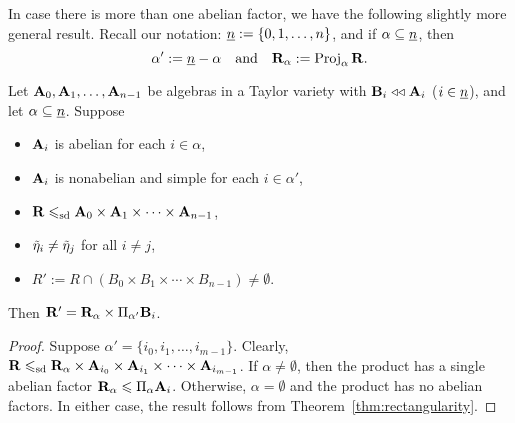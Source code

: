 In case there is more than one abelian factor, we have the following slightly more general result.
Recall our notation: $\underline{n} := \{0,1,\dots, n\}$, and if $\alpha\subseteq \underline{n}$, then 
\[
\alpha' := \underline{n}-\alpha \quad \text{and} \quad
\mathbf{R}_\alpha := \operatorname{Proj}_{\alpha} \mathbf{R}.\]
\begin{corollary}
\label{cor:tayl-vari-abel-fact}
Let $\mathbf{A}_0, \mathbf{A}_1, \dots, \mathbf{A}_{n-1}$ be algebras in a
Taylor variety with $\mathbf{B}_i \mathrel{\triangleleft\triangleleft} \mathbf{A}_i$ ($i\in \underline{n}$),
and let $\alpha \subseteq \underline{n}$.  Suppose
\begin{itemize}
\item $\mathbf{A}_i$ is abelian for each $i \in \alpha$,
\item $\mathbf{A}_i$ is nonabelian and simple for each $i \in \alpha'$,
\item $\mathbf{R} \leqslant_{\mathrm{sd}} \mathbf{A}_0 \times \mathbf{A}_1 \times \cdots \times \mathbf{A}_{n-1}$,
\item $\tilde{\eta}_i \neq \tilde{\eta}_j$ for all $i\neq j$, %
\item $R':= R \cap (B_0 \times B_1 \times \cdots \times B_{n-1}) \neq \emptyset$.
\end{itemize}
Then $\mathbf{R}'= \mathbf{R}_\alpha  \times \Pi_{\alpha'}\mathbf{B}_i$.
\end{corollary}
\begin{proof}
Suppose $\alpha' = \{i_0, i_1, \dots, i_{m-1}\}$.
Clearly, 
$\mathbf{R} \leqslant_{\mathrm{sd}} \mathbf{R}_\alpha \times \mathbf{A}_{i_0} \times \mathbf{A}_{i_1} \times \cdots \times \mathbf{A}_{i_{m-1}}$. 
If $\alpha\neq \emptyset$, then the product 
has a single abelian factor %
$\mathbf{R}_\alpha \leqslant \Pi_{\alpha} \mathbf{A}_i$.
Otherwise, $\alpha= \emptyset$ and the product has no abelian factors.
In either case, the result follows from Theorem~\ref{thm:rectangularity}.
\end{proof}

